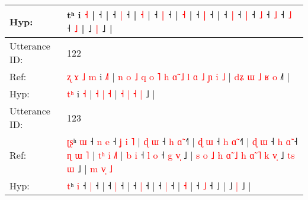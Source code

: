 \documentclass[10pt]{article}
\DeclareRobustCommand{\hl}[1]{{\textcolor{red}{#1}}}
\begin{document}
\begin{longtable}{ll}
 \\
Hyp: & \hl{}\hl{}\hl{}\hl{}\hl{}\hl{}\hl{}\hl{}\hl{}\hl{}\hl{}\hl{}\hl{}\hl{}\hl{}\hl{}\hl{}\hl{}\hl{}\hl{}\hl{}\hl{}\hl{}\hl{}\hl{}\hl{}tʰ i \hl{}\hl{˧} |\hl{}\hl{}\hl{}\hl{}\hl{} ˧\hl{}\hl{}\hl{}\hl{}\hl{}\hl{}\hl{} |\hl{}\hl{}\hl{}\hl{} ˧\hl{}\hl{}\hl{} \hl{}\hl{|} ˧\hl{} |\hl{}\hl{}\hl{}\hl{}\hl{} \hl{}\hl{˧} |\hl{}\hl{}\hl{}\hl{}\hl{}\hl{}\hl{}\hl{}\hl{}\hl{} ˧\hl{}\hl{} \hl{}\hl{|} ˧\hl{} |\hl{}\hl{}\hl{}\hl{}\hl{} \hl{˧} |\hl{}\hl{}\hl{}\hl{}\hl{} ˧\hl{}\hl{} \hl{}\hl{|} ˧\hl{} |\hl{}\hl{} ˧\hl{}\hl{} \hl{|} ˧\hl{}\hl{}\hl{}\hl{} \hl{|} ˧\hl{}\hl{} \hl{˩} ˧\hl{}\hl{} \hl{˩} ˧\hl{}\hl{}\hl{}\hl{}\hl{} \hl{˩} ˧\hl{}\hl{}\hl{}\hl{}\hl{}\hl{} \hl{˩} |\hl{}\hl{}\hl{}\hl{} ˩\hl{}\hl{} \hl{|} ˩\hl{}\hl{}\hl{}\hl{}\hl{}\hl{}\hl{} |
 \\
\midrule
Utterance ID: & 122 \\
Ref: & \hl{ʐ}\hl{ }\hl{ɤ}\hl{ }\hl{˩}\hl{ }\hl{m} i \hl{˩}\hl{˥} |\hl{ }\hl{n}\hl{ }\hl{o}\hl{ }\hl{˩}\hl{ }\hl{q}\hl{ }\hl{o}\hl{ }\hl{˥}\hl{ }\hl{h}\hl{ }\hl{ɑ}\hl{̃}\hl{ }\hl{˩}\hl{ }\hl{l}\hl{ }\hl{ɑ}\hl{ }\hl{˩} \hl{ɲ} \hl{i} \hl{˩} |\hl{ }\hl{d}\hl{ʑ} \hl{ɯ} \hl{˩} \hl{ʁ} \hl{o} ˩\hl{˥} |
 \\
Hyp: & \hl{}\hl{}\hl{}\hl{}\hl{}\hl{t}\hl{ʰ} i \hl{}\hl{˧} |\hl{}\hl{}\hl{}\hl{}\hl{}\hl{}\hl{}\hl{}\hl{}\hl{}\hl{}\hl{}\hl{}\hl{}\hl{}\hl{}\hl{}\hl{}\hl{}\hl{}\hl{}\hl{}\hl{}\hl{}\hl{} \hl{˧} \hl{|} \hl{˧} |\hl{}\hl{}\hl{} \hl{˧} \hl{|} \hl{˧} \hl{|} ˩\hl{} |
 \\
\midrule
Utterance ID: & 123 \\
Ref: & \hl{ʈ}\hl{ʂ}ʰ \hl{ɯ} ˧\hl{ }\hl{n} \hl{e} ˧\hl{ }\hl{ʝ}\hl{ }\hl{i}\hl{ }\hl{˥} |\hl{ }\hl{ɖ}\hl{ }\hl{ɯ} ˧\hl{ }\hl{h} \hl{ɑ}\hl{̃} ˧\hl{˥} |\hl{ }\hl{ɖ}\hl{ }\hl{ɯ} ˧\hl{ }\hl{h} \hl{ɑ}\hl{̃} ˧\hl{˥} |\hl{ }\hl{ɖ}\hl{ }\hl{ɯ} ˧\hl{ }\hl{h} \hl{ɑ}\hl{̃} ˧\hl{ }\hl{ɳ}\hl{ }\hl{ɯ}\hl{ }\hl{˥} |\hl{ }\hl{t}\hl{ʰ}\hl{ }\hl{i} \hl{˩}\hl{˥} |\hl{ }\hl{b}\hl{ }\hl{i} ˧\hl{ }\hl{l} \hl{o} ˧\hl{ }\hl{g}\hl{ }\hl{v}\hl{̩} ˩ |\hl{ }\hl{s}\hl{ }\hl{o}\hl{ }\hl{˩}\hl{ }\hl{h}\hl{ }\hl{ɑ}\hl{̃}\hl{ }\hl{˩}\hl{ }\hl{h}\hl{ }\hl{ɑ}\hl{̃}\hl{ }\hl{˥}\hl{ }\hl{k}\hl{ }\hl{v}\hl{̩} ˩\hl{ }\hl{t}\hl{s} \hl{ɯ} ˩ |\hl{ }\hl{m}\hl{ }\hl{v}\hl{̩}\hl{ }\hl{˩}
 \\
Hyp: & \hl{}\hl{t}ʰ \hl{i} ˧\hl{}\hl{} \hl{|} ˧\hl{}\hl{}\hl{}\hl{}\hl{}\hl{} |\hl{}\hl{}\hl{}\hl{} ˧\hl{}\hl{} \hl{}\hl{|} ˧\hl{} |\hl{}\hl{}\hl{}\hl{} ˧\hl{}\hl{} \hl{}\hl{|} ˧\hl{} |\hl{}\hl{}\hl{}\hl{} ˧\hl{}\hl{} \hl{}\hl{|} ˧\hl{}\hl{}\hl{}\hl{}\hl{}\hl{} |\hl{}\hl{}\hl{}\hl{}\hl{} \hl{}\hl{˧} |\hl{}\hl{}\hl{}\hl{} ˧\hl{}\hl{} \hl{˩} ˧\hl{}\hl{}\hl{}\hl{}\hl{} ˩ |\hl{}\hl{}\hl{}\hl{}\hl{}\hl{}\hl{}\hl{}\hl{}\hl{}\hl{}\hl{}\hl{}\hl{}\hl{}\hl{}\hl{}\hl{}\hl{}\hl{}\hl{}\hl{}\hl{}\hl{}\hl{} ˩\hl{}\hl{}\hl{} \hl{|} ˩ |\hl{}\hl{}\hl{}\hl{}\hl{}\hl{}\hl{}

\end{longtable}
\end{document}

